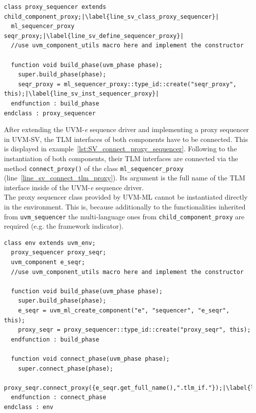 \lstset{language=SystemVerilog, numbers = left, escapechar=|, breaklines=true}
\begin{lstlisting}[frame=htrbl, caption={SystemVerilog: creating a proxy sequencer},
label={lst:SV_proxy_sequencer}]
class proxy_sequencer extends child_component_proxy;|\label{line_sv_class_proxy_sequencer}|
  ml_sequencer_proxy seqr_proxy;|\label{line_sv_define_sequencer_proxy}|
  //use uvm_component_utils macro here and implement the constructor
  
  function void build_phase(uvm_phase phase);
    super.build_phase(phase);
    seqr_proxy = ml_sequencer_proxy::type_id::create("seqr_proxy", this);|\label{line_sv_inst_sequencer_proxy}|
  endfunction : build_phase
endclass : proxy_sequencer
\end{lstlisting}
After extending the UVM-\textit{e} sequence driver and implementing a proxy sequencer in UVM-SV, the TLM interfaces of both components have to be connected. This is displayed in example~\ref{lst:SV_connect_proxy_sequencer}. Following to the instantiation of both components, their TLM interfaces are connected via the method \lstinline$connect_proxy()$ of the class \lstinline$ml_sequencer_proxy$ (line~\ref{line_sv_connect_tlm_proxy}). Its argument is the full name of the TLM interface inside of the UVM-\textit{e} sequence driver.\\
The proxy sequencer class provided by UVM-ML cannot be instantiated directly in the environment. This is, because additionally to the functionalities inherited from \lstinline$uvm_sequencer$ the multi-language ones from \lstinline$child_component_proxy$ are required (e.g. the framework indicator).
\lstset{language=SystemVerilog, numbers = left, escapechar=|, breaklines=true}
\begin{lstlisting}[frame=htrbl, caption={SystemVerilog: connecting proxy sequencer and foreign sequencer},
label={lst:SV_connect_proxy_sequencer}]
class env extends uvm_env;
  proxy_sequencer proxy_seqr;
  uvm_component e_seqr;
  //use uvm_component_utils macro here and implement the constructor
  
  function void build_phase(uvm_phase phase);
    super.build_phase(phase);
    e_seqr = uvm_ml_create_component("e", "sequencer", "e_seqr", this);
    proxy_seqr = proxy_sequencer::type_id::create("proxy_seqr", this);
  endfunction : build_phase
  
  function void connect_phase(uvm_phase phase);
    super.connect_phase(phase);
    proxy_seqr.connect_proxy({e_seqr.get_full_name(),".tlm_if."});|\label{line_sv_connect_tlm_proxy}|
  endfunction : connect_phase
endclass : env
\end{lstlisting}
